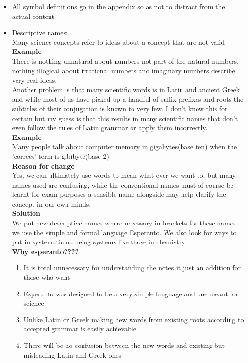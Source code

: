 \documentclass{article}
\begin{document}
\begin{itemize}
\item{All symbol definitions go in the appendix so as not to distract from the actual content}
\item{Descriptive names:\\ Many science concepts refer to ideas about a concept that are not valid  \\ \textbf{Example} \\ There is nothing unnatural about numbers not part of the natural numbers, nothing illogical about irrational numbers and imaginary numbers describe very real ideas.\\ Another problem is that many scientific words is in Latin and ancient Greek and while most of us have picked up a handful of suffix prefixes and roots the subtitles of their conjugation is known to very few. I don't know this for certain but my guess is that this results in many scientific names that don't even follow the rules of Latin grammar or apply them incorrectly. \\ \textbf{Example} \\ Many people talk about computer memory in gigabytes(base ten) when the 'correct' term is gibibyte(base 2)\\
\textbf{Reason for change} \\ Yes, we can ultimately use words to mean what ever we want to, but many names used are confusing, while the conventional names must of course be learnt for exam purposes a sensible name alongside may help clarify the concept in our own minds.\\ \textbf{Solution} \\ We put new descriptive names where necessary in brackets for these names we use the simple and formal language Esperanto. We also look for ways to put in systematic nameing systems like those in chemistry \\ \textbf{Why esperanto????}\\ \begin{enumerate}
\item{It is total unnecessary for understanding the notes it just an addition for those who want}
\item{Esperanto was designed to be a very simple language and one meant for science }
\item{Unlike Latin or Greek making new words from existing roots according to accepted grammar is easily achievable}
\item{There will be no confusion between the new words and existing but misleading Latin and Greek ones}

\end{enumerate}}
\end{itemize}
\end{document}
